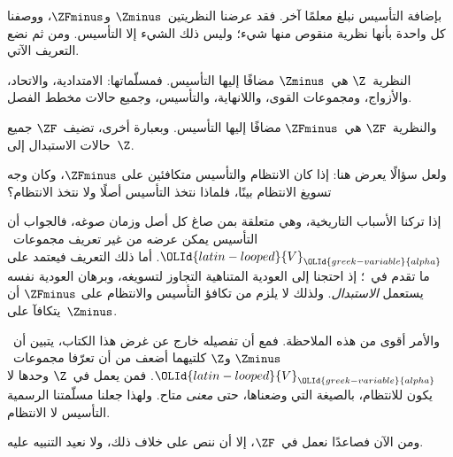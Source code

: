 \documentclass[../../../include/open-logic-section]{subfiles}
\begin{document}

بإضافة التأسيس نبلغ معلمًا آخر. فقد عرضنا النظريتين~$\Zminus$
و$\ZFminus$، ووصفنا كل واحدة بأنها نظرية منقوص منها شيء؛ وليس ذلك
الشيء إلا التأسيس. ومن ثم نضع التعريف الآتي.

\begin{defn}
النظرية~$\Z$ هي~$\Zminus$ مضافًا إليها التأسيس. فمسلّماتها:
الامتدادية، والاتحاد، والأزواج، ومجموعات القوى، واللانهاية، والتأسيس،
وجميع حالات مخطط الفصل.

والنظرية~$\ZF$ هي~$\ZFminus$ مضافًا إليها التأسيس. وبعبارة أخرى،
تضيف~$\ZF$ جميع حالات الاستبدال إلى~$\Z$.
\end{defn}

ولعل سؤالًا يعرض هنا: إذا كان الانتظام والتأسيس متكافئين على
$\ZFminus$، وكان وجه تسويغ الانتظام بينًا، فلماذا نتخذ التأسيس أصلًا
ولا نتخذ الانتظام؟

إذا تركنا الأسباب التاريخية، وهي متعلقة بمن صاغ كل أصل وزمان صوغه،
فالجواب أن التأسيس يمكن عرضه من غير تعريف مجموعات~$\OLId{latin-looped}{V}_\OLId{greek-variable}{alpha}$. أما ذلك
التعريف فيعتمد على ما تقدم في~؛ إذ احتجنا إلى
العودية المتناهية التجاوز لتسويغه، وبرهان العودية نفسه يستعمل
\emph{الاستبدال}. ولذلك لا يلزم من تكافؤ التأسيس والانتظام على
$\ZFminus$ أن يتكافآ على~$\Zminus$.

والأمر أقوى من هذه الملاحظة. فمع أن تفصيله خارج عن غرض هذا الكتاب،
يتبين أن~$\Zminus$ و$\Z$ كلتيهما أضعف من أن تعرّفا مجموعات~$\OLId{latin-looped}{V}_\OLId{greek-variable}{alpha}$.
فمن يعمل في~$\Z$ وحدها لا يكون للانتظام، بالصيغة التي وضعناها، حتى
\emph{معنى} متاح. ولهذا جعلنا مسلّمتنا الرسمية التأسيس لا الانتظام.

ومن الآن فصاعدًا نعمل في~$\ZF$، إلا أن ننص على خلاف ذلك، ولا نعيد
التنبيه عليه.
\end{document}

